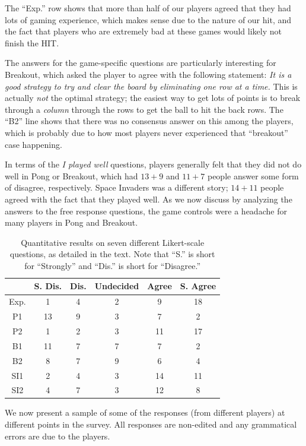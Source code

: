 \documentclass[letterpaper, 10 pt, conference]{ieeeconf}  %
\begin{document}
The ``Exp.'' row shows that more than half of our players agreed that they had lots of gaming
experience, which makes sense due to the nature of our hit, and the fact that players who are
extremely bad at these games would likely not finish the HIT.

The answers for the game-specific questions are particularly interesting for Breakout, which asked
the player to agree with the following statement: \emph{It is a good strategy to try and clear the
board by eliminating one row at a time.} This is actually \emph{not} the optimal strategy; the
easiest way to get lots of points is to break through a \emph{column} through the rows to get the
ball to hit the back rows. The ``B2'' line shows that there was no consensus answer on this among
the players, which is probably due to how most players never experienced that ``breakout'' case
happening.

In terms of the \emph{I played well} questions, players generally felt that they did not do well in
Pong or Breakout, which had $13+9$ and $11+7$ people answer some form of disagree, respectively.
Space Invaders was a different story; $14+11$ people agreed with the fact that they played well. As
we now discuss by analyzing the answers to the free response questions, the game controls were a
headache for many players in Pong and Breakout.

\begin{table}[t]
\centering
\begin{tabular}{|c||c|c|c|c|c|}
\hline
  & S. Dis. & Dis. & Undecided & Agree & S. Agree \\
\hline
Exp. & 1  & 4 & 2 & 9 & 18  \\
\hline
P1 & 13 & 9 & 3 & 7 & 2 \\
P2 & 1 & 2 & 3 & 11 & 17 \\
\hline
B1 & 11 & 7 & 7 & 7 & 2 \\
B2 & 8 &  7 & 9 & 6 & 4 \\
\hline
SI1 & 2 & 4 & 3 & 14 & 11 \\
SI2 & 4 & 7 & 3 & 12 & 8 \\
\hline
\end{tabular}
\caption{Quantitative results on seven different Likert-scale questions, as detailed in the text.
Note that ``S.'' is short for ``Strongly'' and ``Dis.'' is short for ``Disagree.''}
\label{tab:human_results}
\end{table}

We now present a sample of some of the responses (from different players) at different points in the
survey. All responses are non-edited and any grammatical errors are due to the players.
\end{document}
